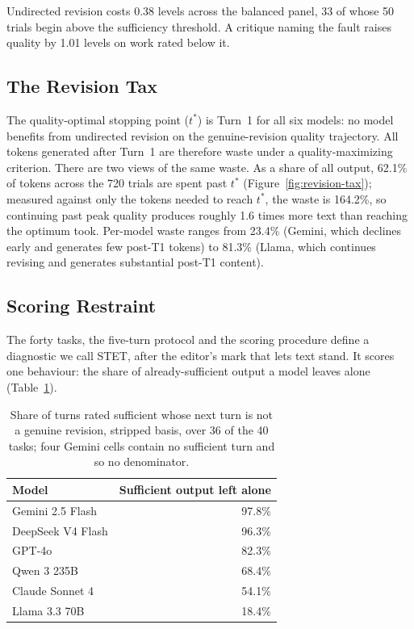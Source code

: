 Undirected revision costs 0.38 levels across the balanced panel, 33 of whose 50 trials begin above the sufficiency threshold. A critique naming the fault raises quality by 1.01 levels on work rated below it.

\FloatBarrier


\subsection{The Revision Tax}

The quality-optimal stopping point ($t^*$) is Turn~1 for all six models: no model benefits from undirected revision on the genuine-revision quality trajectory. All tokens generated after Turn~1 are therefore waste under a quality-maximizing criterion. There are two views of the same waste. As a share of all output, 62.1\% of tokens across the
720 trials are spent past $t^*$ (Figure~\ref{fig:revision-tax}); measured against only the
tokens needed to reach $t^*$, the waste is 164.2\%, so continuing past peak quality produces
roughly 1.6 times more text than reaching the optimum took. Per-model waste ranges from 23.4\% (Gemini, which declines early and generates few post-T1 tokens) to 81.3\% (Llama, which continues revising and generates substantial post-T1 content). 

\subsection{Scoring Restraint}
\label{sec:stet}

The forty tasks, the five-turn protocol and the scoring procedure define a diagnostic we
call STET, after the editor's mark that lets text stand. It scores one behaviour: the share
of already-sufficient output a model leaves alone (Table~\ref{tab:stet}).

\begin{table}[t]
\centering
\small
\begin{tabular}{@{}lr@{}}
\toprule
Model & Sufficient output left alone \\
\midrule
Gemini 2.5 Flash & 97.8\% \\
DeepSeek V4 Flash & 96.3\% \\
GPT-4o & 82.3\% \\
Qwen 3 235B & 68.4\% \\
Claude Sonnet 4 & 54.1\% \\
Llama 3.3 70B & 18.4\% \\
\bottomrule
\end{tabular}
\caption{Share of turns rated sufficient whose next turn is not a genuine revision,
stripped basis, over 36 of the 40 tasks; four Gemini cells contain no sufficient turn and
so no denominator.}
\label{tab:stet}
\end{table}

